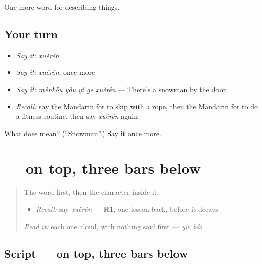 \begin{grammarlens}[title={What you've built}]
One more word for describing things.
\end{grammarlens}

\subsection*{Your turn}
\begin{itemize}
\raggedright
  \item \emph{Say it:} \emph{xuěrén}
  \item \emph{Say it:} \emph{xuěrén}, once more
  \item \emph{Say it:} \emph{ménkǒu yǒu yí ge xuěrén} — There's a snowman by the door.
  \item \emph{Recall:} say the Mandarin for to skip with a rope, then the Mandarin for to do a fitness routine, then say \emph{xuěrén} again
\end{itemize}

\begin{tcolorbox}[breakable,colback=teal!4,colframe=teal!35!black,title={Before you move on}]
What does  mean? (\textquotedblleft{}Snowman\textquotedblright{}.) Say it once more.
\end{tcolorbox}
\section[\texorpdfstring{\zh{雪} (xuě)}{雪 (xuě)}]{ —  on top, three bars below}

\label{lesson:ZH-W221-xue-snow}



\begin{quote}
The word first, then the character inside it.

\begin{itemize}
\raggedright
  \item \emph{Recall:} say \emph{xuěrén} — \textbf{R1}, one lesson back, before it decays
\end{itemize}

\begin{quote}
 
\end{quote}

\emph{Read it:} each one aloud, with nothing said first — \emph{yǔ}, \emph{bái}
\end{quote}

\subsection*{Script —  on top, three bars below}

